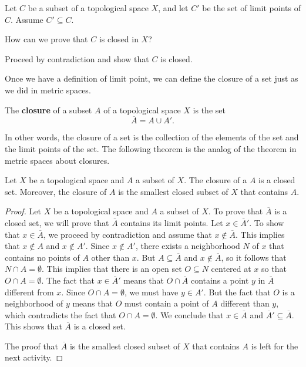 \begin{activity} Let $C$ be a subset of a topological space $X$, and let $C'$ be the set of limit points of $C$. Assume $C' \subseteq C$.
	\ba
	\item How can we prove that $C$ is closed in $X$? 
	
	
	
	\item Proceed by contradiction and show that $C$ is closed. 
	
	
	
	\ea
	
\end{activity}



Once we have a definition of limit point, we can define the closure of a set just as we did in metric spaces. 



\begin{definition} The \textbf{closure} of a subset $A$ of a topological space $X$ is the set 
\[\overline{A} = A \cup A'.\]
\end{definition}



In other words, the closure of a set is the collection of the elements of the set and the limit points of the set. The following theorem is the analog of the theorem in metric spaces about closures. 



\begin{theorem} \label{thm:TS_closure_closed} Let $X$ be a topological space and $A$ a subset of $X$. The closure of a $A$ is a closed set. Moreover, the closure of $A$ is the smallest closed subset of $X$ that contains $A$. 
\end{theorem}

\begin{proof} Let $X$ be a topological space and $A$ a subset of $X$. To prove that $\overline{A}$ is a closed set, we will prove that $\overline{A}$ contains its limit points. Let $x \in \overline{A}'$. To show that $x \in \overline{A}$, we proceed by contradiction and assume that $x \notin \overline{A}$. This implies that $x \notin A$ and $x \notin A'$. Since $x \notin A'$, there exists a neighborhood $N$ of $x$ that contains no points of $A$ other than $x$. But $A \subseteq \overline{A}$ and $x \notin \overline{A}$, so it follows that $N \cap A = \emptyset$. This implies that there is an open set $O \subseteq N$ centered at $x$ so that $O \cap A = \emptyset$. The fact that $x \in \overline{A}'$ means that $O \cap \overline{A}$ contains a point $y$ in $\overline{A}$ different from $x$. Since $O \cap A = \emptyset$, we must have $y \in A'$. But the fact that $O$ is a neighborhood of $y$ means that $O$ must contain a point of $A$ different than $y$, which contradicts the fact that $O \cap A = \emptyset$. We conclude that $x \in \overline{A}$ and $\overline{A}' \subseteq \overline{A}$. This shows that $\overline{A}$ is a closed set. 

The proof that $\overline{A}$ is the smallest closed subset of $X$ that contains $A$ is left for the next activity.
\end{proof}



